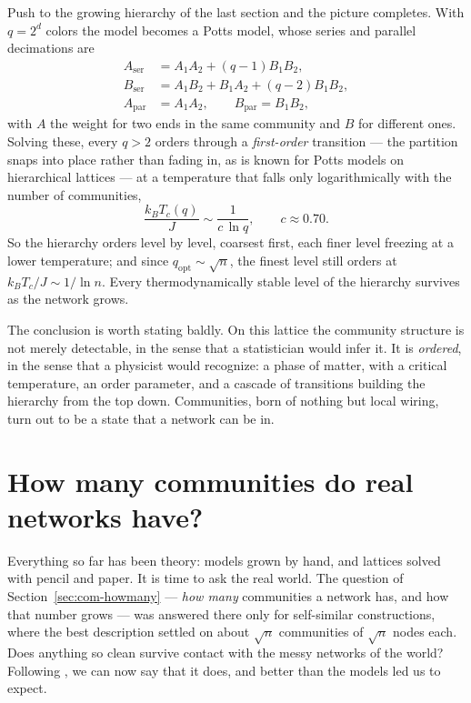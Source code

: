 Push to the growing hierarchy of the last section and the picture completes.
With $q=2^d$ colors the model becomes a Potts model, whose series and parallel
decimations are
\begin{equation}
\begin{aligned}
  A_{\mathrm{ser}} &= A_1A_2 + (q{-}1)B_1B_2, \\
  B_{\mathrm{ser}} &= A_1B_2 + B_1A_2 + (q{-}2)B_1B_2, \\
  A_{\mathrm{par}} &= A_1A_2, \qquad B_{\mathrm{par}} = B_1B_2,
\end{aligned}
\label{eq:com-pottsRG}
\end{equation}
with $A$ the weight for two ends in the same community and $B$ for different ones.
Solving these, every $q>2$ orders through a \emph{first-order} transition --- the
partition snaps into place rather than fading in, as is known for Potts models on
hierarchical lattices \citep{griffiths1982} --- at a temperature that falls only
logarithmically with the
number of communities,
\begin{equation}
  \frac{k_B T_c(q)}{J} \sim \frac{1}{c\,\ln q}, \qquad c\approx 0.70 .
  \label{eq:com-Tcq}
\end{equation}
So the hierarchy orders level by level, coarsest first, each finer level freezing
at a lower temperature; and since $q_{\mathrm{opt}}\sim\sqrt{n}$, the finest level
still orders at $k_BT_c/J\sim1/\ln n$. Every thermodynamically stable level of the
hierarchy survives as the network grows.

The conclusion is worth stating baldly. On this lattice the community structure is
not merely detectable, in the sense that a statistician would infer it. It is
\emph{ordered}, in the sense that a physicist would recognize: a phase of matter,
with a critical temperature, an order parameter, and a cascade of transitions
building the hierarchy from the top down. Communities, born of nothing but local
wiring, turn out to be a state that a network can be in.

\section{How many communities do real networks have?}
\label{sec:com-count}

Everything so far has been theory: models grown by hand, and lattices solved with
pencil and paper. It is time to ask the real world. The
question of Section~\ref{sec:com-howmany} --- \emph{how many} communities a network
has, and how that number grows --- was answered there only for self-similar
constructions, where the best
description settled on about $\sqrt{n}$ communities of $\sqrt{n}$ nodes each. Does
anything so clean survive contact with the messy networks of the world? Following
\citet{vazquezcount2026}, we can now say that it does, and better than the models
led us to expect.

